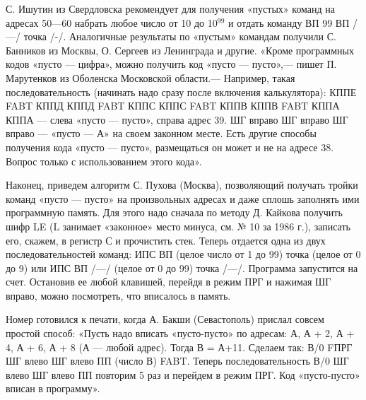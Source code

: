 \documentclass[11pt,a4paper,oneside]{article}
\begin{document}
С. Ишутин из Свердловска рекомендует для получения «пустых» команд на адресах 50—60 набрать любое число от 10 до 10$^{99}$ и отдать команду ВП 99 ВП /—/ точка /-/. Аналогичные результаты по «пустым» командам получили С. Банников из Москвы, О. Сергеев из Ленинграда и другие. «Кроме программных кодов «пусто — цифра», можно получить код «пусто — пусто»,— пишет П. Марутенков из Оболенска Московской области.— Например, такая последовательность (начинать надо сразу после включения калькулятора): КППЕ FABT КППД КППД FABT КППС КППС FABT КППВ КППВ FABT КППА КППА — слева «пусто — пусто», справа адрес 39. ШГ вправо ШГ вправо ШГ вправо — «пусто — А» на своем законном месте. Есть другие способы получения кода «пусто — пусто», размещаться он может и не на адресе 38. Вопрос только с использованием этого кода».

Наконец, приведем алгоритм С. Пухова (Москва), позволяющий получать тройки команд «пусто — пусто» на произвольных адресах и даже сплошь заполнять ими программную память. Для этого надо сначала по методу Д. Кайкова получить шифр LE (L занимает «законное» место минуса, см. № 10 за 1986 г.), записать его, скажем, в регистр С и прочистить стек. Теперь отдается одна из двух последовательностей команд: ИПС ВП (целое число от 1 до 99) точка (целое от 0 до 9) или ИПС ВП /—/ (целое от 0 до 99) точка /—/. Программа запустится на счет. Остановив ее любой клавишей, перейдя в режим ПРГ и нажимая ШГ вправо, можно посмотреть, что вписалось в память.

Номер готовился к печати, когда А. Бакши (Севастополь) прислал совсем простой способ: «Пусть надо вписать «пусто-пусто» по адресам: А, А + 2, А + 4, А + 6, А + 8 (А — любой адрес). Тогда В = А+11. Сделаем так: В/0 FПРГ ШГ влево ШГ влево ПП (число В) FABT. Теперь последовательность В/0 ШГ влево ШГ влево ПП повторим 5 раз и перейдем в режим ПРГ. Код «пусто-пусто» вписан в программу».
\end{document}
